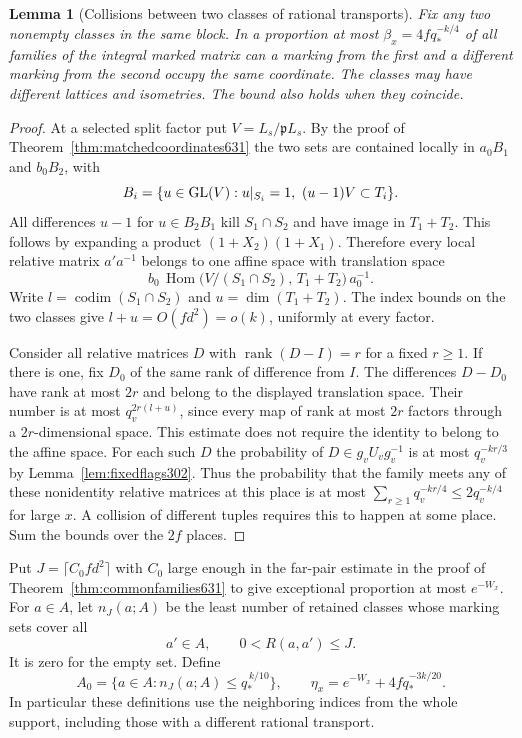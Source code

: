 \documentclass[a4paper,11pt]{article}
\newtheorem{lemma}[proposition]{Lemma}
\theoremstyle{definition}
\theoremstyle{remark}
\numberwithin{equation}{section}
\begin{document}
\begin{lemma}[Collisions between two classes of rational transports]
\leavevmode\label{lem:twoclass632}
Fix any two nonempty classes in the same block. In a
proportion at most \(\beta_x=4f q_*^{-k/4}\) of all families of the
integral marked matrix can a marking from the first and a
\emph{different} marking from the second occupy the same coordinate.
The classes may have different lattices and isometries. The bound
also holds when they coincide.
\end{lemma}
\begin{proof}
At a selected split factor put \(V=L_s/\mathfrak pL_s\).
By the proof of Theorem~\ref{thm:matchedcoordinates631} the two sets
are contained locally in \(a_0B_1\) and \(b_0B_2\), with
\[
 B_i=\{u\in{\rm GL}(V):u|_{S_i}=1,\ (u-1)V\subset T_i\}.
\]
All differences \(u-1\) for \(u\in B_2B_1\) kill \(S_1\cap S_2\)
and have image in \(T_1+T_2\). This follows by expanding a product
\((1+X_2)(1+X_1)\). Therefore every local relative matrix \(a'a^{-1}\)
belongs to one affine space with translation space
\[
 b_0\,\operatorname{Hom}\big(V/(S_1\cap S_2),\,T_1+T_2\big)\,a_0^{-1}.
\]
Write \(l=\operatorname{codim}(S_1\cap S_2)\) and
\(u=\dim(T_1+T_2)\). The index bounds on the two classes give
\(l+u=O(fd^2)=o(k)\), uniformly at every factor.

Consider all relative matrices \(D\) with \(\operatorname{rank}(D-I)=r\)
for a fixed \(r\ge1\). If there is one, fix \(D_0\) of the same rank
of difference from \(I\). The differences \(D-D_0\) have rank
at most \(2r\) and belong to the displayed translation space.
Their number is at most \(q_v^{2r(l+u)}\), since every map of rank at
most \(2r\) factors through a \(2r\)-dimensional space. This estimate
does not require the identity to belong to the affine space.
For each such \(D\) the probability of \(D\in g_vU_vg_v^{-1}\)
is at most \(q_v^{-kr/3}\) by Lemma~\ref{lem:fixedflags302}.
Thus the probability that the family meets any of these nonidentity
relative matrices at this place is at most
\(\sum_{r\ge1}q_v^{-kr/4}\le2q_v^{-k/4}\) for large \(x\).
A collision of different tuples requires this to happen at some
place. Sum the bounds over the \(2f\) places.
\end{proof}

Put \(J=\lceil C_0 f d^2\rceil\) with \(C_0\) large enough in
the far-pair estimate in the proof of Theorem~\ref{thm:commonfamilies631}
to give exceptional proportion at most \(e^{-W_x}\).
For \(a\in A\), let \(n_J(a;A)\) be the least number of retained
classes whose marking sets cover all
\[
             a'\in A,\qquad 0<R(a,a')\le J.
\]
It is zero for the empty set. Define
\[
 A_0=\{a\in A:n_J(a;A)\le q_*^{\,k/10}\},\qquad
       \eta_x=e^{-W_x}+4f q_*^{-3k/20}.
\]
In particular these definitions use the neighboring indices from the
whole support, including those with a different rational transport.
\end{document}
